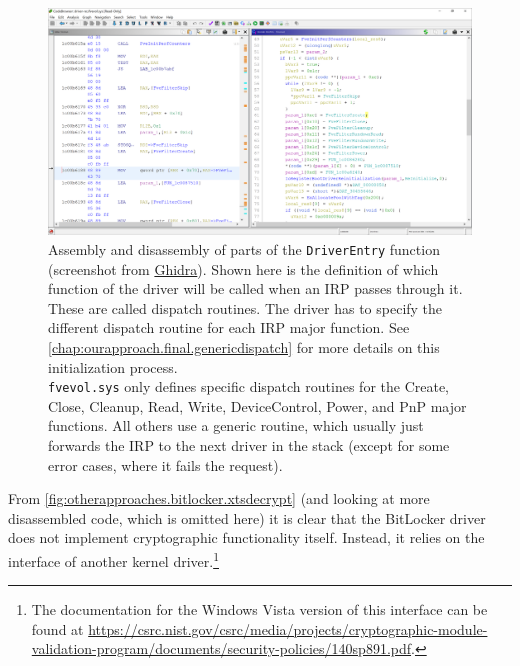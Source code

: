 \begin{figure}[htb!]
	\center
	\includegraphics[scale=0.39]{../img/otherapproaches.bitlocker.driverentry.png}
	\caption[
		Assembly and disassembly of parts of the \texttt{DriverEntry} function
	]{
		Assembly and disassembly of parts of the \texttt{DriverEntry} function (screenshot from \href{https://www.ghidra-sre.org}{Ghidra}). Shown here is the definition of which function of the driver will be called when an IRP passes through it. These are called dispatch routines. The driver has to specify the different dispatch routine for each IRP major function. See \autoref{chap:ourapproach.final.genericdispatch} for more details on this initialization process.\\
		\texttt{fvevol.sys} only defines specific dispatch routines for the Create, Close, Cleanup, Read, Write, DeviceControl, Power, and PnP major functions. All others use a generic routine, which usually just forwards the IRP to the next driver in the stack (except for some error cases, where it fails the request).
	}
	\label{fig:otherapproaches.bitlocker.driverentry}
\end{figure}

From \autoref{fig:otherapproaches.bitlocker.xtsdecrypt} (and looking at more disassembled code, which is omitted here) it is clear that the BitLocker driver does not implement cryptographic functionality itself. Instead, it relies on the interface of another kernel driver.\footnote{\label{fn:otherapproaches.bitlocker.ksecdd} The documentation for the Windows Vista version of this interface can be found at \url{https://csrc.nist.gov/csrc/media/projects/cryptographic-module-validation-program/documents/security-policies/140sp891.pdf}.}

